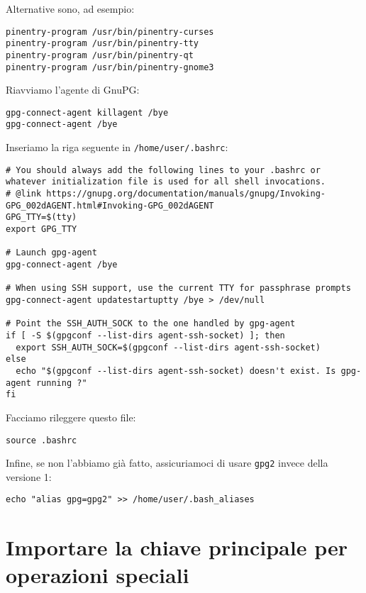 \documentclass[a4paper,10pt]{article}
\begin{document}
Alternative sono, ad esempio:

\begin{lstlisting}
pinentry-program /usr/bin/pinentry-curses
pinentry-program /usr/bin/pinentry-tty
pinentry-program /usr/bin/pinentry-qt
pinentry-program /usr/bin/pinentry-gnome3
\end{lstlisting}

Riavviamo l'agente di GnuPG:

\begin{lstlisting}
gpg-connect-agent killagent /bye
gpg-connect-agent /bye
\end{lstlisting}

Inseriamo la riga seguente in \texttt{/home/user/.bashrc}:

\begin{lstlisting}
# You should always add the following lines to your .bashrc or whatever initialization file is used for all shell invocations.
# @link https://gnupg.org/documentation/manuals/gnupg/Invoking-GPG_002dAGENT.html#Invoking-GPG_002dAGENT
GPG_TTY=$(tty)
export GPG_TTY

# Launch gpg-agent
gpg-connect-agent /bye

# When using SSH support, use the current TTY for passphrase prompts
gpg-connect-agent updatestartuptty /bye > /dev/null

# Point the SSH_AUTH_SOCK to the one handled by gpg-agent
if [ -S $(gpgconf --list-dirs agent-ssh-socket) ]; then
  export SSH_AUTH_SOCK=$(gpgconf --list-dirs agent-ssh-socket)
else
  echo "$(gpgconf --list-dirs agent-ssh-socket) doesn't exist. Is gpg-agent running ?"
fi
\end{lstlisting}

Facciamo rileggere questo file:

\begin{lstlisting}
source .bashrc
\end{lstlisting}

Infine, se non l'abbiamo già fatto, assicuriamoci di usare \texttt{gpg2} invece della versione 1:

\begin{lstlisting}
echo "alias gpg=gpg2" >> /home/user/.bash_aliases
\end{lstlisting}

\section{Importare la chiave principale per operazioni speciali} \label{importare-chiave}
\end{document}
